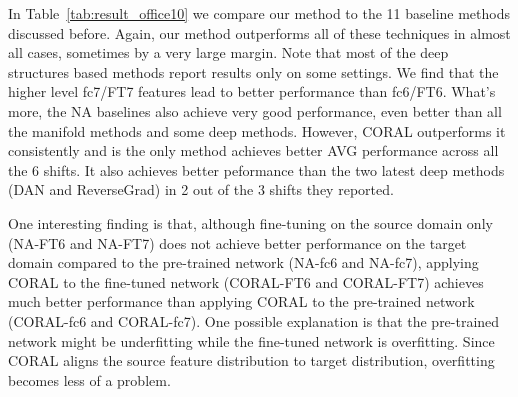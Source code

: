 \documentclass[letterpaper]{article}
\begin{document}
\begin{table}[t]
\centering
{}
\caption{\small Review classification accuracies of the 4 standard domain shifts~\cite{gong-icml13} on the Amazon dataset~\cite{Blitzer07Biographies} with bag-of-words features.}
\label{tab:result_nlp}
\vspace{-0.1in}
\end{table}

In Table~\ref{tab:result_office10} we compare our method to the 11 baseline methods discussed before. Again, our method outperforms all of these techniques in almost all cases, sometimes by a very large margin. Note that most of the deep structures based methods report results only on some settings. We find that the higher level fc7/FT7 features lead to better performance than fc6/FT6. What's more, the NA baselines also achieve very good performance, even better than all the manifold methods and some deep methods. However, CORAL outperforms it consistently and is the only method achieves better AVG performance across all the 6 shifts. It also achieves better peformance than the two latest deep methods (DAN and ReverseGrad) in 2 out of the 3 shifts they reported.

One interesting finding is that, although fine-tuning on the source domain only (NA-FT6 and NA-FT7) does not achieve better performance on the target domain compared to the pre-trained network (NA-fc6 and NA-fc7), applying CORAL to the fine-tuned network (CORAL-FT6 and CORAL-FT7) achieves much better performance than applying CORAL to the pre-trained network (CORAL-fc6 and CORAL-fc7). One possible explanation is that the pre-trained network might be underfitting while the fine-tuned network is overfitting. Since CORAL aligns the source feature distribution to target distribution, overfitting becomes less of a problem. 
\end{document}

